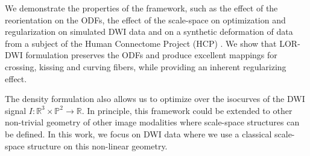\documentclass[twocolumn]{svjour3}
\begin{document}
We demonstrate the properties of the framework, such as the effect of the reorientation on
the ODFs, the effect of the scale-space on optimization and regularization on simulated
DWI data and on a synthetic deformation of data from a subject of the Human Connectome
Project (HCP) \cite{van2013wu}. We show that LOR-DWI formulation preserves the ODFs and
produce excellent mappings for crossing, kissing and curving fibers, while providing an
inherent regularizing effect.






The density formulation also allows us to optimize over the isocurves of the DWI signal
$I:\mathbb{R}^3\times\mathbb{P}^2\rightarrow\mathbb{R}$.  In principle, this framework
could be extended to other non-trivial geometry of other image modalities where
scale-space structures can be defined. In this work, we focus on DWI data where we use a
classical scale-space structure on this non-linear geometry.
\end{document}
